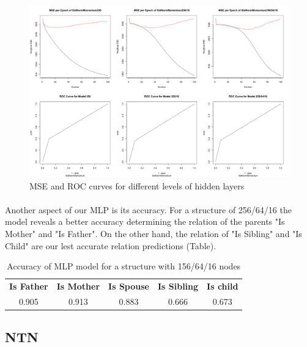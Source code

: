 \documentclass[11.5pt]{article}
\newcounter{graphics}
\begin{document}
\begin{figure}[h!]
  \includegraphics[width=1\textwidth]{report_mlp/different_layers_MSE_ROC_2.png}
    \caption{\small MSE and ROC curves for different levels of hidden layers}
    \label{MSE_ROC}
\end{figure}


\paragraph{} Another aspect of our MLP is its accuracy. For a structure of 256/64/16 the model reveals a better accuracy determining the relation of the parents "Is Mother" and "Is Father". On  the other hand, the relation of "Is Sibling" and  "Is Child" are our lest accurate relation predictions (Table).

\begin{table}[h!]
\centering
\caption{Accuracy of MLP model for a structure with 156/64/16 nodes}
\label{MLP-accuracy}
\begin{tabular}{lllll}
\textbf{Is Father}        & \textbf{Is Mother}        & \textbf{Is Spouse}        & \textbf{Is Sibling}       & \textbf{Is child}         \\
\multicolumn{1}{c}{0.905} & \multicolumn{1}{c}{0.913} & \multicolumn{1}{c}{0.883} & \multicolumn{1}{c}{0.666} & \multicolumn{1}{c}{0.673} \\
 
\end{tabular}
\end{table}







\subsection{NTN}
\end{document}

